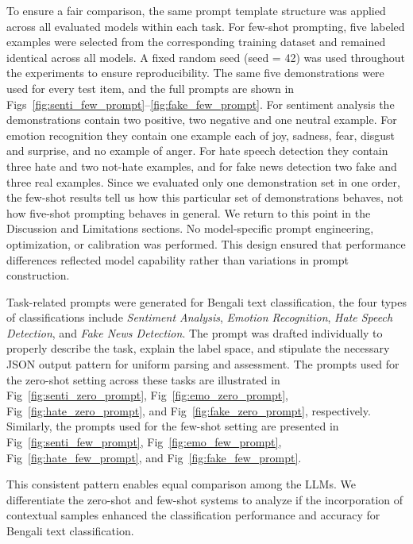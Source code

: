 \documentclass[10pt,letterpaper]{article}
\begin{document}
To ensure a fair comparison, the same prompt template structure was applied across all evaluated models within each task. For few-shot prompting, five labeled examples were selected from the corresponding training dataset and remained identical across all models. A fixed random seed (seed = 42) was used throughout the experiments to ensure reproducibility. The same five demonstrations were used for every test item, and the full prompts are shown in Figs~\ref{fig:senti_few_prompt}--\ref{fig:fake_few_prompt}. For sentiment analysis the demonstrations contain two positive, two negative and one neutral example. For emotion recognition they contain one example each of joy, sadness, fear, disgust and surprise, and no example of anger. For hate speech detection they contain three hate and two not-hate examples, and for fake news detection two fake and three real examples. Since we evaluated only one demonstration set in one order, the few-shot results tell us how this particular set of demonstrations behaves, not how five-shot prompting behaves in general. We return to this point in the Discussion and Limitations sections. No model-specific prompt engineering, optimization, or calibration was performed. This design ensured that performance differences reflected model capability rather than variations in prompt construction.



Task-related prompts were generated for Bengali text classification, the four types of classifications include \textit{Sentiment Analysis}, \textit{Emotion Recognition}, \textit{Hate Speech Detection}, and \textit{Fake News Detection}. 
The prompt was drafted individually to properly describe the task, explain the label space, and stipulate the necessary JSON output pattern for uniform parsing and assessment.
The prompts used for the zero-shot setting across these tasks are illustrated in Fig~\ref{fig:senti_zero_prompt}, Fig~\ref{fig:emo_zero_prompt}, Fig~\ref{fig:hate_zero_prompt}, and Fig~\ref{fig:fake_zero_prompt}, respectively. Similarly, the prompts used for the few-shot setting are presented in Fig~\ref{fig:senti_few_prompt}, Fig~\ref{fig:emo_few_prompt}, Fig~\ref{fig:hate_few_prompt}, and Fig~\ref{fig:fake_few_prompt}.

This consistent pattern enables equal comparison among the LLMs. 
We differentiate the zero-shot and few-shot systems to analyze if the incorporation of contextual samples enhanced the classification performance and accuracy for Bengali text classification. 
\end{document}
